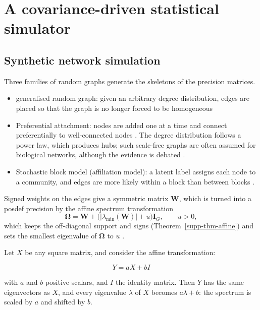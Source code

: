 \section{A covariance-driven statistical simulator}
\label{app:simulator}

\subsection{Synthetic network simulation}
\label{sec-synthetic-network}

Three families of random graphs generate the skeletons of the precision matrices.
\begin{itemize}
    \item generalised random graph: given an arbitrary degree distribution, edges are placed so that
        the graph is no longer forced to be homogeneous
        \cite{newmanRandomGraphsModels2002}
    \item Preferential attachment: nodes are added one at a time and connect preferentially to
        well-connected nodes \cite{barabasiEmergenceScalingRandom1999,newmanStructureDynamicsNetworks2011}.
        The degree distribution follows a power law, which produces hubs; such scale-free graphs are often
        assumed for biological networks, although the evidence is debated
        \cite{lima-mendezPowerfulLawPower2009,broidoScalefreeNetworksAre2019}.
    \item Stochastic block model (affiliation model): a latent label assigns each node to a community,
        and edges are more likely within a block than between blocks
        \cite{hollandStochasticBlockmodelsFirst1983}.
\end{itemize}

Signed weights on the edges give a symmetric matrix \(\boldsymbol{W}\), which is turned into a
\gls{posdef} precision by the affine spectrum transformation
\begin{equation}
  \boldsymbol{\Omega}=\boldsymbol{W}+\bigl(\lvert\lambda_{\min}(\boldsymbol{W})\rvert+u\bigr)\mathbf{I}_{G},
  \qquad u>0,
  \label{eq-affine-spectrum-transformation}
\end{equation}
which keeps the off-diagonal support and signs (Theorem~\ref{supp-thm-affine}) and sets the
smallest eigenvalue of \(\boldsymbol{\Omega}\) to \(u\) \cite{chiquetVariationalInferenceSparse2018}.



\begin{theorem}
    \label{supp-thm-affine}

    Let $X$ be any square matrix, and consider the affine transformation:

    \[
        Y = aX + bI
    \]

    with $a$ and $b$ positive scalars, and $I$ the identity matrix. Then
    $Y$ has the same eigenvectors as $X$, and every eigenvalue
    $\lambda$ of $X$ becomes $a\lambda+b$: the \gls{spectrum} is scaled by $a$ and shifted by $b$.
\end{theorem}



